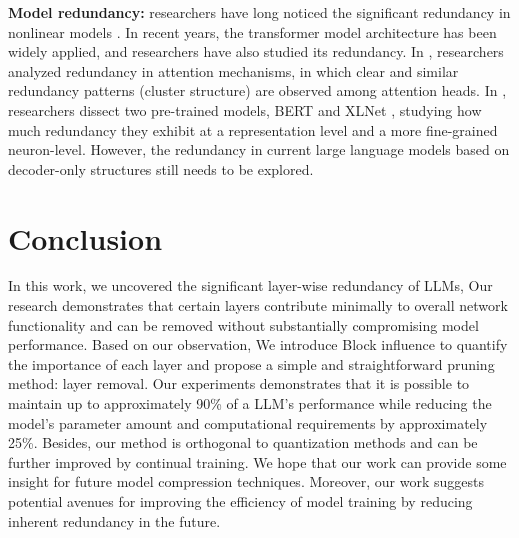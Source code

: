 		
		\textbf{Model redundancy:} researchers have long noticed the significant redundancy in nonlinear models \citep{catchpole1997detecting}. In recent years, the transformer model architecture has been widely applied, and researchers have also studied its redundancy. In \citep{bian2021attention}, researchers analyzed redundancy in attention mechanisms, in which clear and similar redundancy patterns (cluster structure) are observed among attention heads. In \citep{dalvi2020analyzing}, researchers dissect two pre-trained models, BERT \citep{devlin2018bert} and XLNet \citep{yang2019xlnet}, studying how much redundancy they exhibit at a representation level and a more fine-grained neuron-level. However, the redundancy in current large language models based on decoder-only structures still needs to be explored. 
		
		\section{Conclusion}
		
		In this work,  we uncovered the significant layer-wise redundancy of LLMs, Our research demonstrates that certain layers contribute minimally to overall network functionality and can be removed without substantially compromising model performance. Based on our observation, We introduce Block influence to quantify the importance of each layer and propose a simple and straightforward pruning method: layer removal. Our experiments demonstrates that it is possible to maintain up to approximately 90\% of a LLM's performance while reducing the model's parameter amount and computational requirements by approximately 25\%. Besides, our method is orthogonal to quantization methods and can be further improved by continual training. We hope that our work can provide some insight for future model compression techniques. 
		Moreover, our work suggests potential avenues for improving the efficiency of model training by reducing inherent redundancy in the future.
		
		\newpage
						
		\newpage

